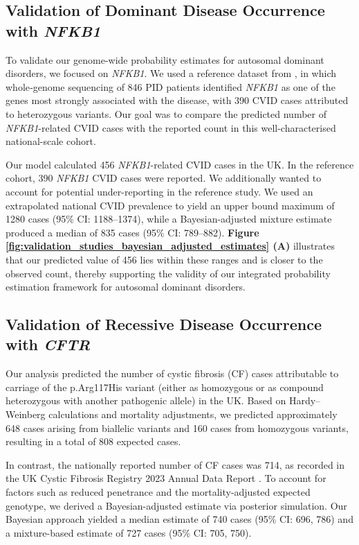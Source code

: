 \subsection{Validation of Dominant Disease Occurrence with \textit{NFKB1}}

To validate our genome-wide probability estimates for autosomal dominant disorders, we focused on \textit{NFKB1}. We used a reference dataset from \citet{tuijnenburgNFKB12018}, in which whole‐genome sequencing of 846 PID patients identified \textit{NFKB1} as one of the genes most strongly associated with the disease, with 390 CVID cases attributed to heterozygous variants. Our goal was to compare the predicted number of \textit{NFKB1}-related CVID cases with the reported count in this well-characterised national-scale cohort.

Our model calculated 456 \textit{NFKB1}-related CVID cases in the UK. In the reference cohort,  390  \textit{NFKB1} CVID cases were reported. 
We additionally wanted to account for potential under-reporting in the reference study.
We used an extrapolated national CVID prevalence to yield an upper bound maximum of 1280 cases (95\% CI: 1188–1374), while a Bayesian-adjusted mixture estimate produced a median of 835 cases (95\% CI: 789–882). 
\textbf{Figure \ref{fig:validation_studies_bayesian_adjusted_estimates} (A)}
illustrates that our predicted value of 456 lies within these ranges and is closer to the observed count, thereby supporting the validity of our integrated probability estimation framework for autosomal dominant disorders.

\subsection{Validation of Recessive Disease Occurrence with \textit{CFTR}}

Our analysis predicted the number of cystic fibrosis (CF) cases attributable to carriage of the p.Arg117His variant (either as homozygous or as compound heterozygous with another pathogenic allele) in the UK. Based on Hardy–Weinberg calculations and mortality adjustments, we predicted approximately 648 cases arising from biallelic variants and 160 cases from homozygous variants, resulting in a total of 808 expected cases.

In contrast, the nationally reported number of CF cases was 714, as recorded in the UK Cystic Fibrosis Registry 2023 Annual Data Report
\cite{naito2023uk}. To account for factors such as reduced penetrance and the mortality-adjusted expected genotype, we derived a Bayesian-adjusted estimate via posterior simulation. Our Bayesian approach yielded a median estimate of 740 cases (95\% CI: 696, 786) and a mixture-based estimate of 727 cases (95\% CI: 705, 750).

